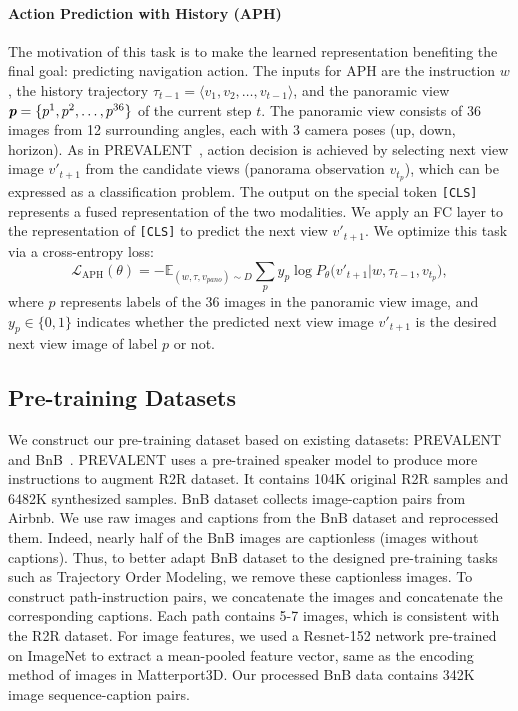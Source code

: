 \documentclass[10pt,twocolumn,letterpaper]{article}
\begin{document}
\vspace{-5pt}
\paragraph{Action Prediction with History (APH)}
The motivation of this task is to make the learned representation benefiting the final goal: predicting navigation action. 
The inputs for APH are the instruction $w$, the history trajectory $\tau_{t-1} =\langle v_{1}, v_{2}, \dots, v_{t-1}\rangle$, and the panoramic view $\textit{\textbf{p}} = \{ p^1, p^2, \dots, p^{36}\}$ of the current step $t$.
The panoramic view consists of 36 images from 12 surrounding angles, each with 3 camera poses (up, down, horizon).
As in PREVALENT~\cite{prevalent}, action decision is achieved by selecting next view image $v'_{t+1}$ from the candidate views (\ie panorama observation $v_{t_p}$), which can be expressed as a classification problem.
The output on the special token \texttt{[CLS]} represents a fused representation of the two modalities. We apply an FC layer to the representation of \texttt{[CLS]} to predict the next view $v'_{t+1}$.
We optimize this task via a cross-entropy loss:
{\small
\begin{equation}
    \mathcal{L}_{\text{APH}}(\theta) = -\mathbb{E}_{({w}, {\tau},{v_{pano}})\sim D}\sum_{p}{y_p\log P_{\theta}(v'_{t+1}|w, {\tau_{t-1}}, v_{t_p}}),\end{equation}}where $p$ represents labels of the 36 images in the panoramic view image, and $y_p\in \{0, 1\}$ indicates whether the predicted next view image $v'_{t+1}$ is the desired next view image of label $p$ or not.

\subsection{Pre-training Datasets}
We construct our pre-training dataset based on existing datasets: PREVALENT~\cite{prevalent} and BnB~\cite{airbert}. PREVALENT uses a pre-trained speaker model to produce more instructions to augment R2R dataset. It contains 104K original R2R samples and 6482K synthesized samples. BnB dataset collects image-caption pairs from Airbnb. We use raw images and captions from the BnB dataset and reprocessed them. 
Indeed, nearly half of the BnB images are captionless (\ie images without captions).
Thus, to better adapt BnB dataset to the designed pre-training tasks such as Trajectory Order Modeling, we remove these captionless images. 
To construct path-instruction pairs, we concatenate the images and concatenate the corresponding captions. 
Each path contains 5-7 images, which is consistent with the R2R dataset. 
For image features, we used a Resnet-152 network pre-trained on ImageNet to extract a mean-pooled feature vector, same as the encoding method of images in Matterport3D.
Our processed BnB data contains 342K image sequence-caption pairs. 
\end{document}
